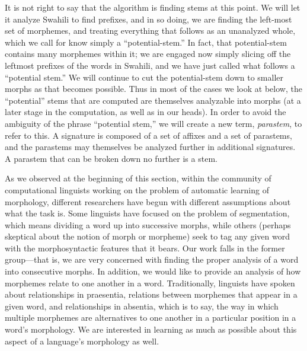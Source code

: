 \documentclass[output=paper,colorlinks,citecolor=brown,
]{langscibook}
\begin{document}
It is not right to say that the algorithm is finding stems at this point. We will let it analyze Swahili to find prefixes, and in so doing, we are finding the left-most set of morphemes, and treating everything that follows as an unanalyzed whole, which we call for know simply a ``potential-stem.'' In fact, that potential-stem contains many morphemes within it; we are engaged now simply slicing off the leftmost prefixes of the words in Swahili, and we have just called what follows a ``potential stem.''  We will continue to cut the potential-stem down to smaller morphs as that becomes possible. Thus in most of the cases we look at below, the ``potential'' stems that are computed are themselves analyzable into morphs (at a later stage in the computation, as well as in our heads). In order to avoid the ambiguity of the phrase ``potential stem,'' we will create a new term, \textit{parastem}, to refer to this. A signature is composed of a set of affixes and a set of parastems, and the parastems may themselves be analyzed further in additional signatures. A parastem that can be broken down no further is a stem.

As we observed at the beginning of this section, within the community of computational linguists working on the problem of automatic learning of morphology, different researchers have begun with different assumptions about what the task is. Some linguists have focused on the problem of segmentation, which means dividing a word up into successive morphs, while others (perhaps skeptical about the notion of morph or morpheme) seek to tag any given word with the morphosyntactic features that it bears. Our work falls in the former group---that is, we are very concerned with finding the proper analysis of a word into consecutive morphs. In addition, we would like to provide an analysis of how morphemes relate to one another in a word. Traditionally, linguists have spoken about relationships in praesentia, relations between morphemes that appear in a given word, and relationships in absentia, which is to say, the way in which multiple morphemes are alternatives to one another in a particular position in a word's morphology. We are interested in learning as much as possible about this aspect of a language's morphology as well.
 
\end{document}
